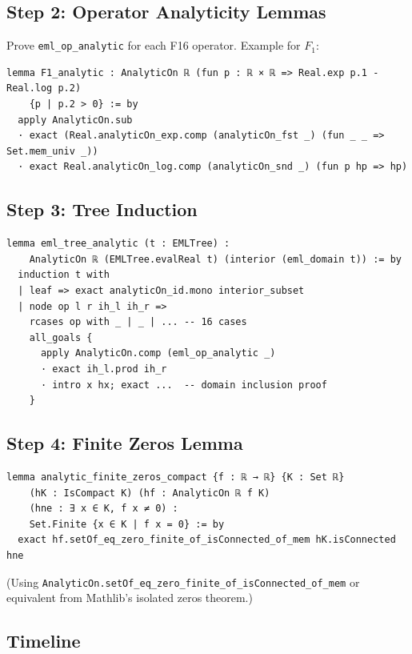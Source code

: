 \documentclass[12pt]{article}
\theoremstyle{definition}
\begin{document}
\subsection{Step 2: Operator Analyticity Lemmas}

Prove \texttt{eml\_op\_analytic} for each F16 operator.  Example for $F_1$:
\begin{verbatim}
lemma F1_analytic : AnalyticOn ℝ (fun p : ℝ × ℝ => Real.exp p.1 - Real.log p.2)
    {p | p.2 > 0} := by
  apply AnalyticOn.sub
  · exact (Real.analyticOn_exp.comp (analyticOn_fst _) (fun _ _ => Set.mem_univ _))
  · exact Real.analyticOn_log.comp (analyticOn_snd _) (fun p hp => hp)
\end{verbatim}

\subsection{Step 3: Tree Induction}

\begin{verbatim}
lemma eml_tree_analytic (t : EMLTree) :
    AnalyticOn ℝ (EMLTree.evalReal t) (interior (eml_domain t)) := by
  induction t with
  | leaf => exact analyticOn_id.mono interior_subset
  | node op l r ih_l ih_r =>
    rcases op with _ | _ | ... -- 16 cases
    all_goals {
      apply AnalyticOn.comp (eml_op_analytic _)
      · exact ih_l.prod ih_r
      · intro x hx; exact ...  -- domain inclusion proof
    }
\end{verbatim}

\subsection{Step 4: Finite Zeros Lemma}

\begin{verbatim}
lemma analytic_finite_zeros_compact {f : ℝ → ℝ} {K : Set ℝ}
    (hK : IsCompact K) (hf : AnalyticOn ℝ f K)
    (hne : ∃ x ∈ K, f x ≠ 0) :
    Set.Finite {x ∈ K | f x = 0} := by
  exact hf.setOf_eq_zero_finite_of_isConnected_of_mem hK.isConnected hne
\end{verbatim}

(Using \texttt{AnalyticOn.setOf\_eq\_zero\_finite\_of\_isConnected\_of\_mem}
or equivalent from Mathlib's isolated zeros theorem.)

\subsection{Timeline}
\end{document}
